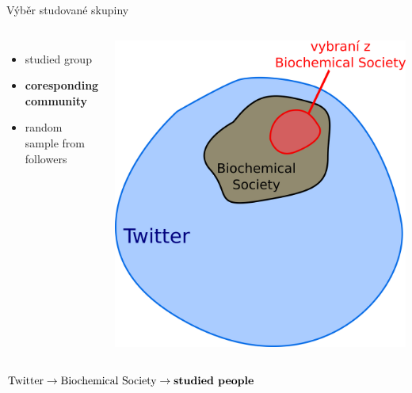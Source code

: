 \documentclass[notheorems,12pt]{beamer}
\begin{document}
\begin{frame}{Výběr studované skupiny}
    \vspace{-0.7cm}
    \begin{columns}
    \column{5cm}
    	\begin{itemize}
    		\item studied group
    		\item \textbf{coresponding community}
    		\item random sample from followers
    	\end{itemize}
    \column{6cm}
    	\center
    	\includegraphics[scale=0.32]{./Pics/sets.png}
    \end{columns}
    \center
    \begin{large}
        $\text{Twitter} \rightarrow \text{Biochemical Society} \rightarrow \text{\textbf{studied people}}$
    \end{large}
\end{frame}
\end{document}

